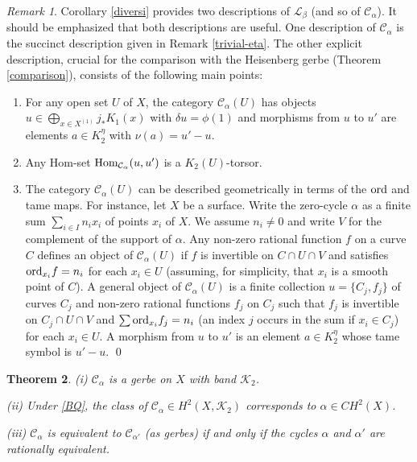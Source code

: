 \documentclass{amsart}
\numberwithin{equation}{subsection}
\newtheorem{theorem}{Theorem}[section]
\theoremstyle{remark}
\newtheorem{remark}[theorem]{Remark}
\theoremstyle{remark}
\newcommand{\cC}{\mathcal{C}}
\newcommand{\cK}{\mathcal{K}}
\newcommand{\cL}{\mathcal{L}}
\begin{document}
\begin{remark} Corollary \ref{diversi} provides two descriptions of $\cL_{\beta}$ (and so of $\cC_{\alpha}$). It should be emphasized that both descriptions are useful. One  description of $\cC_{\alpha}$ is the succinct description given in Remark \ref{trivial-eta}. The other explicit description, crucial for the comparison with the Heisenberg gerbe (Theorem \ref{comparison}), consists of the following main points: 

  \begin{enumerate}
  \item For any open set $U$ of $X$, the category $\cC_{\alpha}(U)$ has objects $u \in \bigoplus\limits_{x \in X^{(1)}} j_* K_1(x)$ with $\delta{u} = \phi(1)$ and morphisms from $u$ to $u'$ are elements $a \in K_2^{\eta}$ with $\nu(a) = u'-u$. 

  \item Any Hom-set ${\rm Hom}_{\cC_{\alpha}}(u, u')$ is a $K_2(U)$-torsor.

  \item The category $\cC_{\alpha}(U)$ can be described geometrically in terms of the ${\rm ord}$ and tame maps. For instance, let $X$ be a surface. Write the zero-cycle $\alpha$ as a finite sum $ \sum_{i\in I} n_i x_i$ of points $x_i$ of $X$. We assume $n_i \neq 0$ and write $V$ for the complement of the support of $\alpha$. Any non-zero rational function $f$ on a curve $C$ defines an object of $\cC_{\alpha}(U)$ if $f$ is invertible on $C \cap U\cap V$ and satisfies ${\rm ord}_{x_i} f = n_i$ for each  $x_i \in U$ (assuming, for simplicity, that $x_i$ is a smooth point of $C$). A general object of $\cC_{\alpha}(U)$ is a finite collection $u = \{C_j, f_j\}$ of curves $C_j$ and non-zero rational functions $f_j$ on $C_j$ such that $f_j$ is invertible on $C_j \cap U \cap V$ and $\sum {\rm ord}_{x_i} f_j = n_i$ (an index $j$ occurs in the sum if $x_i \in C_j$) for each  $x_i \in U$. A morphism from  $u$ to $u'$ is an element $a \in K_2^{\eta}$ whose tame symbol is $u' - u$. \qed 
  \end{enumerate}
\end{remark}

\begin{theorem}\label{k2gerbe} (i) $\cC_{\alpha}$ is a gerbe on $X$ with band $\cK_2$. 

(ii) Under \eqref{BQ}, the class of $\cC_{\alpha} \in H^2(X, \cK_2)$ corresponds to $\alpha \in CH^2(X)$.

(iii) $\cC_{\alpha}$ is equivalent to $\cC_{\alpha'}$ (as gerbes) if and only if the cycles $\alpha$ and $\alpha'$ are rationally equivalent.\end{theorem} 
\end{document}
